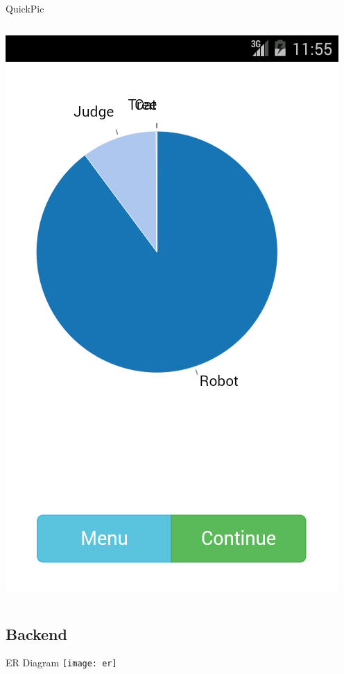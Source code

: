 \documentclass[aspectratio=169]{beamer}
\begin{document}
\begin{frame}{QuickPic}
\begin{columns}[c]
\begin{column}{0.3\columnwidth}
      \includegraphics[width=\textwidth,height=\textheight,keepaspectratio]{ss_quickpic_stats}
    \end{column}
  \end{columns}
\end{frame}

\subsection{Backend}

\begin{frame}{ER Diagram}
  \centering
  \texttt{[image: er]}
\end{frame}
\end{document}
